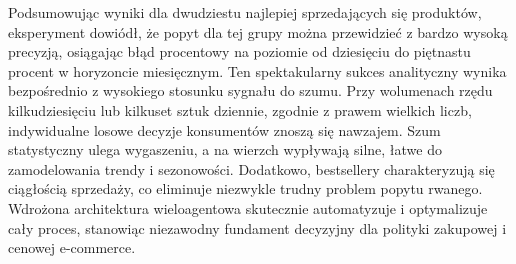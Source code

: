 \documentclass[12pt,a4paper]{article}
\begin{document}
Podsumowując wyniki dla dwudziestu najlepiej sprzedających się produktów, eksperyment dowiódł, że popyt dla tej grupy można przewidzieć z bardzo wysoką precyzją, osiągając błąd procentowy na poziomie od dziesięciu do piętnastu procent w horyzoncie miesięcznym. Ten spektakularny sukces analityczny wynika bezpośrednio z wysokiego stosunku sygnału do szumu. Przy wolumenach rzędu kilkudziesięciu lub kilkuset sztuk dziennie, zgodnie z prawem wielkich liczb, indywidualne losowe decyzje konsumentów znoszą się nawzajem. Szum statystyczny ulega wygaszeniu, a na wierzch wypływają silne, łatwe do zamodelowania trendy i sezonowości. Dodatkowo, bestsellery charakteryzują się ciągłością sprzedaży, co eliminuje niezwykle trudny problem popytu rwanego. Wdrożona architektura wieloagentowa skutecznie automatyzuje i optymalizuje cały proces, stanowiąc niezawodny fundament decyzyjny dla polityki zakupowej i cenowej e-commerce.
\end{document}
